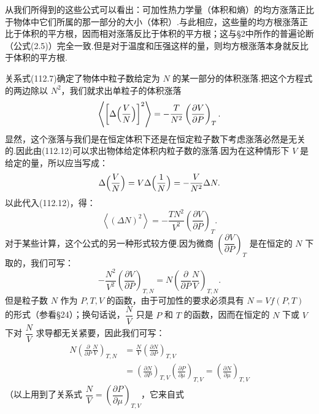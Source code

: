 从我们所得到的这些公式可以看出：可加性热力学量（体积和熵）的均方涨落正比于物体中它们所属的那一部分的大小（体积）.与此相应，这些量的均方根涨落正比于体积的平方根，因而相对涨落反比于体积的平方根；这与§2中所作的普遍论断（公式(2.5)）完全一致.但是对于温度和压强这样的量，则均方根涨落本身就反比于体积的平方根.

关系式(112.7)确定了物体中粒子数给定为 $N$ 的某一部分的体积涨落.把这个方程式的两边除以
$N^{2}$，我们就求出单粒子的体积涨落
\begin{equation}
  \left\langle\left[\Delta\Bigl(\frac{V}{N}\Bigr)\right]^{2}\right\rangle
  =-\frac{T}{N^{2}}\left(\frac{\partial V}{\partial P}\right)_{T}.
\end{equation}
显然，这个涨落与我们是在恒定体积下还是在恒定粒子数下考虑涨落必然是无关的.因此由(112.12)可以求出物体给定体积内粒子数的涨落.因为在这种情形下 $V$ 是给定的量，所以应当写成：
\begin{equation*}
  \Delta\Bigl(\frac{V}{N}\Bigr)=V\Delta\Bigl(\frac{1}{N}\Bigr)
  =-\frac{V}{N^{2}}\Delta N.
\end{equation*}
以此代入(112.12)，得：
\begin{equation}
  \left\langle(\Delta N)^{2}\right\rangle
  =-\frac{TN^{2}}{V^{2}}\left(\frac{\partial V}{\partial P}\right)_{T}.
\end{equation}
对于某些计算，这个公式的另一种形式较方便.因为微商
$\left(\dfrac{\partial V}{\partial P}\right)_{T}$ 是在恒定的 $N$ 下取的，我们可写：
\begin{equation*}
  -\frac{N^{2}}{V^{2}}\left(\frac{\partial V}{\partial P}\right)_{T,N}
  =N\left(\frac{\partial}{\partial P}\frac{N}{V}\right)_{T,N}.
\end{equation*}
但是粒子数 $N$ 作为 $P,T,V$ 的函数，由于可加性的要求必须具有 $N=Vf(P,T)$ 的形式（参看§24）；换句话说，$\dfrac{N}{V}$ 只是 $P$ 和 $T$ 的函数，因而在恒定的 $N$ 下或 $V$ 下对
$\dfrac{N}{V}$ 求导都无关紧要，因此我们可写：
\begin{equation*}
\begin{aligned}
  N\left(\frac{\partial}{\partial P}\frac{N}{V}\right)_{T,N}
  &=\frac{N}{V}\left(\frac{\partial N}{\partial P}\right)_{T,V}\\
  &=\left(\frac{\partial N}{\partial P}\right)_{T,V}
  \left(\frac{\partial P}{\partial\mu}\right)_{T,V}
  =\left(\frac{\partial N}{\partial\mu}\right)_{T,V}
\end{aligned}
\end{equation*}
（以上用到了关系式 $\dfrac{N}{V}=\left(\dfrac{\partial P}{\partial\mu}\right)_{T,V}$，它来自式
